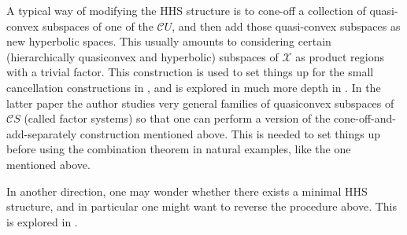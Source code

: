\documentclass[11pt,oneside]{amsart}
\theoremstyle{definition}
\newcommand{\cuco}[1]{{\mathcal #1}}
\newcommand{\fontact}{{\mathcal C}}
\begin{document}
A typical way of modifying the HHS structure is to cone-off a collection of quasi-convex subspaces of one of the $\fontact U$, and then add those quasi-convex subspaces as new hyperbolic spaces. This usually amounts to considering certain (hierarchically quasiconvex and hyperbolic) subspaces of $\cuco X$ as product regions with a trivial factor. This construction is used to set things up for the small cancellation constructions in \cite{HHS_asdim}, and is explored in much more depth in \cite{Spriano}. In the latter paper the author studies very general families of quasiconvex subspaces of $\fontact S$ (called factor systems) so that one can perform a version of the cone-off-and-add-separately construction mentioned above. This is needed to set things up before using the combination theorem in natural examples, like the one mentioned above.

In another direction, one may wonder whether there exists a minimal HHS structure, and in particular one might want to reverse the procedure above. This is explored in \cite{HHS_stable}.



 


\end{document}
